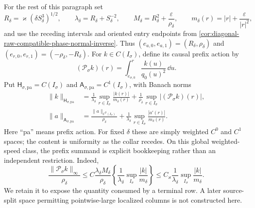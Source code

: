 For the rest of this paragraph set
\begin{equation}
 R_\delta=\varkappa(\delta S_\delta^3)^{1/2},\qquad
 \lambda_\delta=R_\delta+S_\delta^{-2},\qquad
 M_\delta=R_\delta^2+\frac{\varepsilon}{\rho_\delta},
 \qquad
 m_\delta(r)=|r|+\frac{\varepsilon}{|r|^2},       \label{eq:prefix-action-diagonal-scales}
\end{equation}
and use the receding intervals and oriented entry endpoints from
\cref{cor:diagonal-raw-compatible-phase-normal-inverse}.  Thus
\((e_{a,0},e_{a,1})=(R_\delta,\rho_\delta)\) and
\((e_{r,0},e_{r,1})=(-\rho_\delta,-R_\delta)\).
For \(k\in C(I_\sigma)\), define its causal prefix action by
\begin{equation}
 (\mathcal P_\sigma k)(r)
 =\int_{e_{\sigma,0}}^r\frac{k(u)}{q_0(u)^2}\,\dd u.          \label{eq:causal-prefix-action}
\end{equation}
Put
\(\mathsf H_{\sigma,\mathrm{pa}}=C(I_\sigma)\) and
\(\mathsf A_{\sigma,\mathrm{pa}}=C^1(I_\sigma)\), with Banach norms
\begin{align}
 \|k\|_{\mathsf H_{\sigma,\mathrm{pa}}}
 &=\frac1{\lambda_\delta}
     \sup_{r\in I_\sigma}\frac{|k(r)|}{m_\delta(r)}
   +\frac1{\rho_\delta}
     \sup_{r\in I_\sigma}|(\mathcal P_\sigma k)(r)|,
                                                        \label{eq:prefix-action-source-norm}\\
 \|a\|_{\mathsf A_{\sigma,\mathrm{pa}}}
 &=\frac{\|a\|_{C^0(I_\sigma)}}{\rho_\delta}
   +\frac1{\lambda_\delta}
     \sup_{r\in I_\sigma}\frac{|a'(r)|}{m_\delta(r)}.
                                                        \label{eq:prefix-action-phase-norm}
\end{align}
Here ``pa'' means prefix action.  For fixed \(\delta\) these are simply
weighted \(C^0\) and \(C^1\) spaces; the content is uniformity as the
collar recedes.
On this global weighted-speed class, the prefix summand is explicit
bookkeeping rather than an independent restriction.  Indeed,
\begin{equation}
 \frac{\|\mathcal P_\sigma k\|_\infty}{\rho_\delta}
 \le C\frac{\lambda_\delta M_\delta}{\rho_\delta}
       \left\{\frac1{\lambda_\delta}
       \sup_{I_\sigma}\frac{|k|}{m_\delta}\right\}
 \le C_\varkappa\frac1{\lambda_\delta}
       \sup_{I_\sigma}\frac{|k|}{m_\delta}.       \label{eq:prefix-action-pointwise-domination}
\end{equation}
We retain it to expose the quantity consumed by a terminal row.  A later
source-split space permitting pointwise-large localized columns is not
constructed here.


